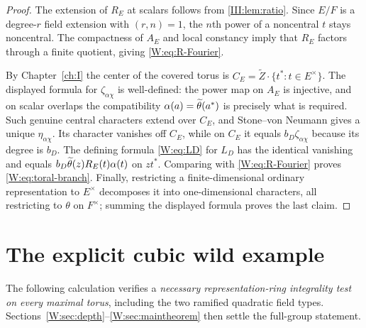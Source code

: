 \begin{proof}
The extension of $R_E$ at scalars follows from \cref{III:lem:ratio}.  Since $E/F$ is a degree-$r$ field extension with
$(r,n)=1$, the $n$th power of a noncentral $t$ stays noncentral.
The compactness of $A_E$ and local constancy imply that $R_E$
factors through a finite quotient, giving \eqref{W:eq:R-Fourier}.

By Chapter~\ref{ch:I} the center of the covered torus is
$C_E=\widetilde Z\cdot\{t^*:t\in E^\times\}$.  The displayed
formula for $\zeta_{\alpha\chi}$ is well-defined: the
power map on $A_E$ is injective, and on scalar overlaps the
compatibility $\alpha(a)=\widetilde\theta(a^*)$ is precisely
what is required.  Such genuine central characters extend over
$C_E$, and Stone--von Neumann gives a unique $\eta_{\alpha\chi}$.
Its character vanishes off $C_E$, while on $C_E$ it equals
$b_D\zeta_{\alpha\chi}$ because its degree is $b_D$.
The defining formula \eqref{W:eq:LD} for $L_D$ has the identical
vanishing and equals $b_D\widetilde\theta(z)R_E(t)\alpha(t)$
on $z t^*$.  Comparing with \eqref{W:eq:R-Fourier} proves
\eqref{W:eq:toral-branch}.  Finally, restricting a finite-dimensional
ordinary representation to $E^\times$ decomposes it into
one-dimensional characters, all restricting to $\theta$ on
$F^\times$; summing the displayed formula proves the last claim.
\end{proof}

\section{The explicit cubic wild example}\label{W:sec:examplewild}
The following calculation verifies a \emph{necessary representation-ring
integrality test on every maximal torus}, including the two ramified
quadratic field types.  Sections~\ref{W:sec:depth}--\ref{W:sec:maintheorem}
then settle the full-group statement.

